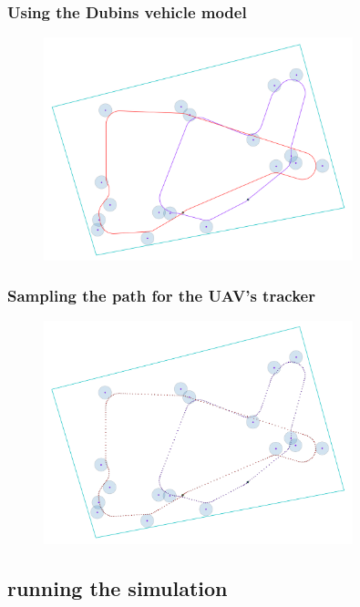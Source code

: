 \documentclass[aspectratio=1610]{beamer}
\begin{document}
\begin{frame}
  \frametitle{Using the Dubins vehicle model}

  \begin{figure}
    \includegraphics[width=0.8\textwidth]{./fig/tsp_dubins.png}
  \end{figure}

\end{frame}

\begin{frame}
  \frametitle{Sampling the path for the UAV's tracker}

  \begin{figure}
    \includegraphics[width=0.8\textwidth]{./fig/tsp_dubins_sampled.png}
  \end{figure}

\end{frame}

\subsection{running the simulation}
\end{document}
